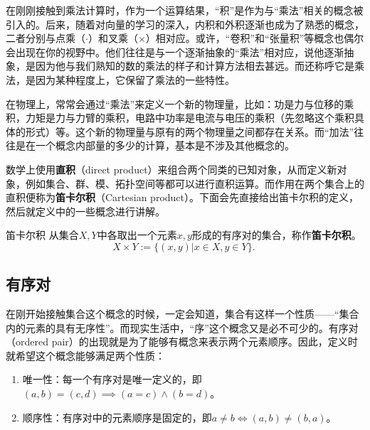 
\begin{issues}
\issueDraft
\end{issues}

在刚刚接触到乘法计算时，作为一个运算结果，“积”是作为与“乘法”相关的概念被引入的。后来，随着对向量的学习的深入，内积和外积逐渐也成为了熟悉的概念，二者分别与点乘（$\cdot$）和叉乘（$\times$）相对应。或许，“卷积”和“张量积”等概念也偶尔会出现在你的视野中。他们往往是与一个逐渐抽象的“乘法”相对应，说他逐渐抽象，是因为他与我们熟知的数的乘法的样子和计算方法相去甚远。而还称呼它是乘法，是因为某种程度上，它保留了乘法的一些特性。

在物理上，常常会通过“乘法”来定义一个新的物理量，比如：功是力与位移的乘积，力矩是力与力臂的乘积，电路中功率是电流与电压的乘积（先忽略这个乘积具体的形式）等。这个新的物理量与原有的两个物理量之间都存在关系。而“加法”往往是在一个概念内部量的多少的计算，基本是不涉及其他概念的。

数学上使用\textbf{直积}（direct product）来组合两个同类的已知对象，从而定义新对象，例如集合、群、模、拓扑空间等都可以进行直积运算。而作用在两个集合上的直积便称为\textbf{笛卡尔积}（Cartesian product）。下面会先直接给出笛卡尔积的定义，然后就定义中的一些概念进行讲解。

\begin{definition}{笛卡尔积}\label{def_CartPr_1}
从集合$X,Y$中各取出一个元素$x,y$形成的有序对的集合，称作\textbf{笛卡尔积}。
\begin{equation}
X\times Y:=\{(x,y)|x\in X,y\in Y\}.~
\end{equation}

\end{definition}

\subsection{有序对}

在刚开始接触集合这个概念的时候，一定会知道，集合有这样一个性质——“集合内的元素的具有无序性”。而现实生活中，“序”这个概念又是必不可少的。有序对（ordered pair）的出现就是为了能够有概念来表示两个元素顺序。因此，定义时就希望这个概念能够满足两个性质：

\begin{enumerate}
\item 唯一性：每一个有序对是唯一定义的，即$(a, b) = (c, d)\implies (a = c) \land (b = d)$。
\item 顺序性：有序对中的元素顺序是固定的，即$a\neq b\iff(a, b)\neq (b, a)$。
\end{enumerate}

